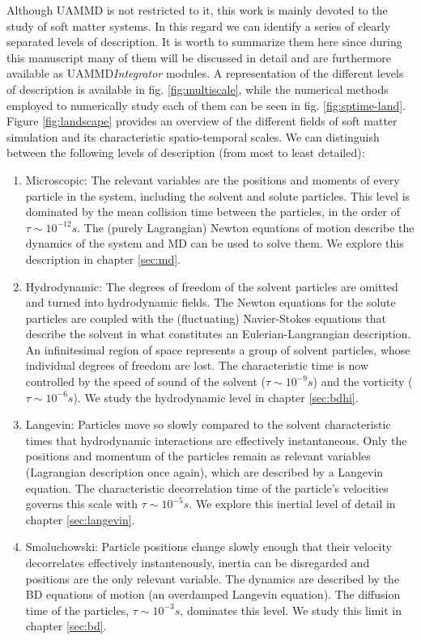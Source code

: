 \documentclass[ twoside,openright,titlepage,numbers=noenddot,%
headinclude,footinclude,cleardoublepage=empty,abstract=on,
BCOR=5mm,paper=a4,fontsize=11pt, dvipsnames
]{scrreprt}
\newcommand{\uammd}{\gls{UAMMD}\xspace}
\begin{document}
Although \uammd is not restricted to it, this work is mainly devoted to the study of soft matter systems. In this regard we can identify a series of clearly separated levels of description. It is worth to summarize them here since during this manuscript many of them will be discussed in detail and are furthermore available as \uammd \emph{Integrator} modules. A representation of the different levels of description is available in fig. \ref{fig:multiscale}, while the numerical methods employed to numerically study each of them can be seen in fig. \ref{fig:sptime-land}. Figure \ref{fig:landscape} provides an overview of the different fields of soft matter simulation and its characteristic spatio-temporal scales. We can distinguish between the following levels of description (from most to least detailed):
\begin{enumerate}
\item Microscopic: The relevant variables are the positions and moments of every particle in the system, including the solvent and solute particles. This level is dominated by the mean collision time between the particles, in the order of $\tau \sim 10^{-12} s$. The (purely Lagrangian) Newton equations of motion describe the dynamics of the system and \gls{MD} can be used to solve them. We explore this description in chapter \ref{sec:md}.
\item Hydrodynamic: The degrees of freedom of the solvent particles are omitted and turned into hydrodynamic fields. The Newton equations for the solute particles are coupled with the (fluctuating) Navier-Stokes equations that describe the solvent in what constitutes an Eulerian-Langrangian description. An infinitesimal region of space represents a group of solvent particles, whose individual degrees of freedom are lost. The characteristic time is now controlled by the speed of sound of the solvent ($\tau \sim 10^{-9}s$) and the vorticity ($\tau \sim 10^{-6}s$). We study the hydrodynamic level in chapter \ref{sec:bdhi}.
\item Langevin: Particles move so slowly compared to the solvent characteristic times that hydrodynamic interactions are effectively instantaneous. Only the positions and momentum of the particles remain as relevant variables (Lagrangian description once again), which are described by a Langevin equation. The characteristic decorrelation time of the particle's velocities governs this scale with $\tau\sim 10^{-5}s$. We explore this inertial level of detail in chapter \ref{sec:langevin}.
\item Smoluchowski: Particle positions change slowly enough that their velocity decorrelates effectively instantenously, inertia can be disregarded and positions are the only relevant variable. The dynamics are described by the \gls{BD} equations of motion (an overdamped Langevin equation). The diffusion time of the particles, $\tau \sim 10^{-3} s$, dominates this level. We study this limit in chapter \ref{sec:bd}.
\end{enumerate}
\end{document}
